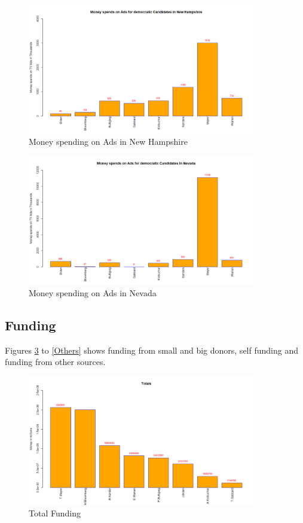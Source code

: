 \begin{figure}[H]
    \centering
    \includegraphics[width=0.9\textwidth]{figures/Newhampshire.png}
    \caption{Money spending on Ads in New Hampshire}
    \label{Newhampshire}
\end{figure}

\begin{figure}[H]
    \centering
    \includegraphics[width=0.9\textwidth]{figures/Nevada.png}
    \caption{Money spending on Ads in Nevada}
    \label{Nevada}
\end{figure}

\subsection{Funding}
Figures \ref{Total} to \ref{Others} shows funding from small and big donors,  self funding and funding from other sources.  
\begin{figure}[H]
    \centering
    \includegraphics[width=0.9\textwidth]{figures/Total.png}
    \caption{Total Funding}
    \label{Total}
\end{figure}

